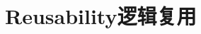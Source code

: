 \documentclass[oneside]{book}
\begin{document}
% 
% 
% 
% 
% 
% 
% 
% 
% 
% 
% 
%  
%  
%  
%  
%  
% 
% 
% 
% 
% 

\chapter{Reusability\hfill 逻辑复用}
% 

\end{document}
